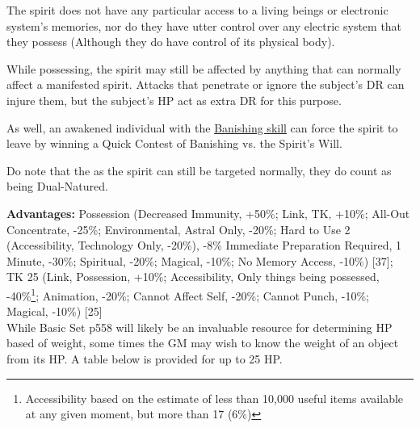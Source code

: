 \begin{multicols}{3}
	The spirit does not have any particular access to a living beings or electronic system's memories, nor do they have utter control over any electric system that they possess (Although they do have control of its physical body).
	
	While possessing, the spirit may still be affected by anything that can normally affect a manifested spirit. Attacks that penetrate or ignore the subject’s DR can injure them, but the subject's HP act as extra DR for this purpose. 
	
	As well, an awakened individual with the \hyperref[banishing]{Banishing skill} can force the spirit to leave by winning a Quick Contest of Banishing vs. the Spirit's Will.
	
	Do note that the as the spirit can still be targeted normally, they do count as being Dual-Natured.
	
	\textbf{Advantages:} Possession (Decreased Immunity, +50\%; Link, TK, +10\%; All-Out Concentrate, -25\%; Environmental, Astral Only, -20\%; Hard to Use 2 (Accessibility, Technology Only, -20\%), -8\% Immediate Preparation Required, 1 Minute, -30\%; Spiritual, -20\%; Magical, -10\%; No Memory Access, -10\%) [37]; TK 25 (Link, Possession, +10\%; Accessibility, Only things being possessed, -40\%\footnote{Accessibility based on the estimate of less than 10,000 useful items available at any given moment, but more than 17 (6\%)}; Animation, -20\%; Cannot Affect Self, -20\%; Cannot Punch, -10\%; Magical, -10\%) [25]\\
	
	While Basic Set p558 will likely be an invaluable resource for determining HP based of weight, some times the GM may wish to know the weight of an object from its HP. A table below is provided for up to 25 HP.
	

\end{multicols}
